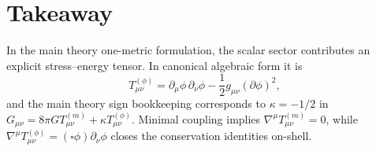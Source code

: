 \documentclass[11pt]{article}
\begin{document}
\section*{Takeaway}
In the main theory one-metric formulation, the scalar sector contributes an explicit stress--energy tensor. In canonical algebraic form it is
\[
T^{(\phi)}_{\mu\nu}=\partial_\mu\phi\,\partial_\nu\phi-\frac12 g_{\mu\nu}(\partial\phi)^2,
\]
and the main theory sign bookkeeping corresponds to $\kappa=-1/2$ in $G_{\mu\nu}=8\pi G T^{(m)}_{\mu\nu}+\kappa T^{(\phi)}_{\mu\nu}$. Minimal coupling implies $\nabla^\mu T^{(m)}_{\mu\nu}=0$, while $\nabla^\mu T^{(\phi)}_{\mu\nu}=(\square\phi)\partial_\nu\phi$ closes the conservation identities on-shell.
\end{document}
